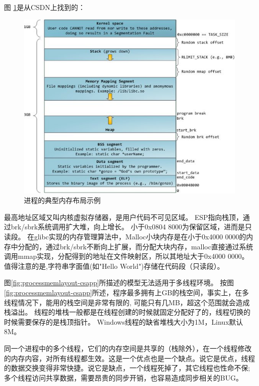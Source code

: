 图 \ref{fig:processmemlayout-csdn}是从CSDN上找到的：
\begin{figure}[ht]
	\begin{center}
		\includegraphics[keepaspectratio,width=0.5\paperwidth]{Pictures/Kernel/LinuxCppMemLayout3.png}
	\caption{进程的典型内存布局示例}
	\label{fig:processmemlayout-csdn}
	\end{center}
\end{figure}


最高地址区域又叫内核虚拟存储器，是用户代码不可见区域。
ESP指向栈顶，通过brk/sbrk系统调用扩大堆，向上增长。
小于0x0804 8000为保留区域，进而是只读段。
在glibc实现的内存管理算法中，Malloc小块内存是在小于0x4000 0000的内存中分配的，通过brk/sbrk不断向上扩展，而分配大块内存，malloc直接通过系统调用mmap实现，分配得到的地址在文件映射区，所以其地址大于0x4000 0000。
值得注意的是,字符串字面值(如"Hello World")存储在代码段（只读段）。

图\ref{fig:processmemlayout-csapp}所描述的模型无法适用于多线程环境。
按图\ref{fig:processmemlayout-csapp}所述，程序最多拥有上GB的栈空间，事实上，在多线程情况下，能用的栈空间是非常有限的, 可能只有几MB，超这个范围就会造成栈溢出。
线程的堆栈一般都是在线程创建的时候就固定分配好了的，线程切换的时候需要保存的是栈顶指针。
Windows线程的缺省堆栈大小为1M，Linux默认8M。

同一个进程中的多个线程，它们的内存空间是共享的（栈除外），在一个线程修改的内存内容，对所有线程都生效。这是一个优点也是一个缺点。说它是优点，线程的数据交换变得非常快捷。说它是缺点，一个线程死掉了，其它线程也性命不保; 多个线程访问共享数据，需要昂贵的同步开销，也容易造成同步相关的BUG。


